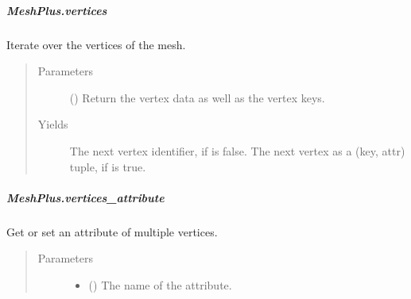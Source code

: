 \documentclass[letterpaper,10pt,english]{sphinxmanual}
\begin{document}
\begin{fulllineitems}
\subparagraph{MeshPlus.vertices}
\label{\detokenize{api/generated/directional_clustering.mesh.MeshPlus.vertices:meshplus-vertices}}\label{\detokenize{api/generated/directional_clustering.mesh.MeshPlus.vertices::doc}}

\begin{fulllineitems}
\label{\detokenize{api/generated/directional_clustering.mesh.MeshPlus.vertices:directional_clustering.mesh.MeshPlus.vertices}}
Iterate over the vertices of the mesh.
\begin{quote}\begin{description}
\item[{Parameters}] \leavevmode
{} () \textendash{} Return the vertex data as well as the vertex keys.

\item[{Yields}] \leavevmode
{} \textendash{} The next vertex identifier, if  is false.
The next vertex as a (key, attr) tuple, if  is true.

\end{description}\end{quote}

\end{fulllineitems}



\subparagraph{MeshPlus.vertices\_attribute}
\label{\detokenize{api/generated/directional_clustering.mesh.MeshPlus.vertices_attribute:meshplus-vertices-attribute}}\label{\detokenize{api/generated/directional_clustering.mesh.MeshPlus.vertices_attribute::doc}}

\begin{fulllineitems}
\label{\detokenize{api/generated/directional_clustering.mesh.MeshPlus.vertices_attribute:directional_clustering.mesh.MeshPlus.vertices_attribute}}
Get or set an attribute of multiple vertices.
\begin{quote}\begin{description}
\item[{Parameters}] \leavevmode\begin{itemize}
\item {} 
 () \textendash{} The name of the attribute.


\end{itemize}
\end{description}
\end{quote}
\end{fulllineitems}
\end{fulllineitems}
\end{document}
